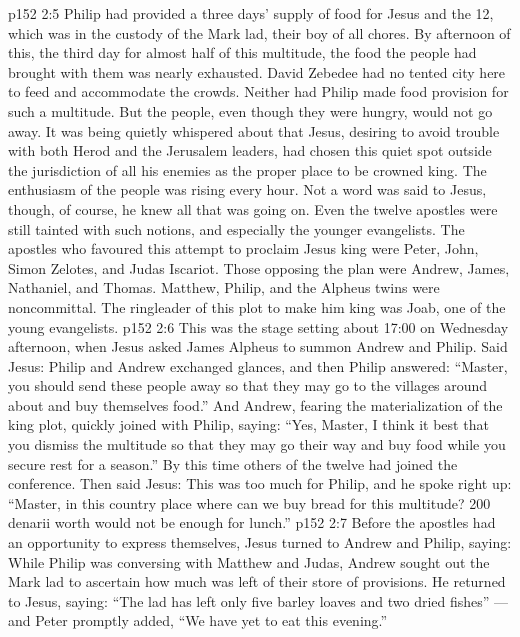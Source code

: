 \vs p152 2:5 \pc Philip had provided a three days’ supply of food for Jesus and the 12, which was in the custody of the Mark lad, their boy of all chores. By afternoon of this, the third day for almost half of this multitude, the food the people had brought with them was nearly exhausted. David Zebedee had no tented city here to feed and accommodate the crowds. Neither had Philip made food provision for such a multitude. But the people, even though they were hungry, would not go away. It was being quietly whispered about that Jesus, desiring to avoid trouble with both Herod and the Jerusalem leaders, had chosen this quiet spot outside the jurisdiction of all his enemies as the proper place to be crowned king. The enthusiasm of the people was rising every hour. Not a word was said to Jesus, though, of course, he knew all that was going on. Even the twelve apostles were still tainted with such notions, and especially the younger evangelists. The apostles who favoured this attempt to proclaim Jesus king were Peter, John, Simon Zelotes, and Judas Iscariot. Those opposing the plan were Andrew, James, Nathaniel, and Thomas. Matthew, Philip, and the Alpheus twins were noncommittal. The ringleader of this plot to make him king was Joab, one of the young evangelists.
\vs p152 2:6 \pc This was the stage setting about 17:00 on Wednesday afternoon, when Jesus asked James Alpheus to summon Andrew and Philip. Said Jesus:  Philip and Andrew exchanged glances, and then Philip answered: “Master, you should send these people away so that they may go to the villages around about and buy themselves food.” And Andrew, fearing the materialization of the king plot, quickly joined with Philip, saying: “Yes, Master, I think it best that you dismiss the multitude so that they may go their way and buy food while you secure rest for a season.” By this time others of the twelve had joined the conference. Then said Jesus:  This was too much for Philip, and he spoke right up: “Master, in this country place where can we buy bread for this multitude? 200 denarii worth would not be enough for lunch.”
\vs p152 2:7 Before the apostles had an opportunity to express themselves, Jesus turned to Andrew and Philip, saying:  While Philip was conversing with Matthew and Judas, Andrew sought out the Mark lad to ascertain how much was left of their store of provisions. He returned to Jesus, saying: “The lad has left only five barley loaves and two dried fishes” --- and Peter promptly added, “We have yet to eat this evening.”
